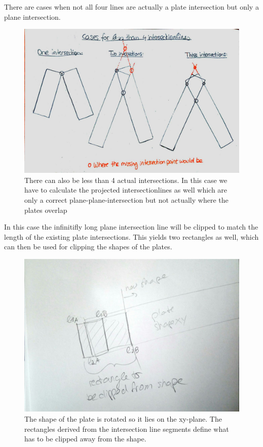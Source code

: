 \documentclass[../ClassicThesis.tex]{subfiles}
\begin{document}
There are cases when not all four lines are actually a plate intersection but only a plane intersection. 
\begin{figure}[!ht]
\centering
\includegraphics[width=\columnwidth]{Images/10-joints-casesOfLines.jpg}
\caption{There can also be less than 4 actual intersections. In this case we have to calculate the projected intersectionlines as well which are only a correct plane-plane-intersection but not actually where the plates overlap}
\end{figure}

In this case the infinitifly long plane intersection line will be clipped to match the length of the existing plate intersections. This yields two rectangles as well, which can then be used for clipping the shapes of the plates.
\begin{figure}[!ht]
\centering
\includegraphics[width=.5\columnwidth, angle=90]{Images/06-1-graph-clippingRectangles.jpg}
\caption{The shape of the plate is rotated so it lies on the xy-plane. The rectangles derived from the intersection line segments define what has to be clipped away from the shape.}
\end{figure}
\end{document}
